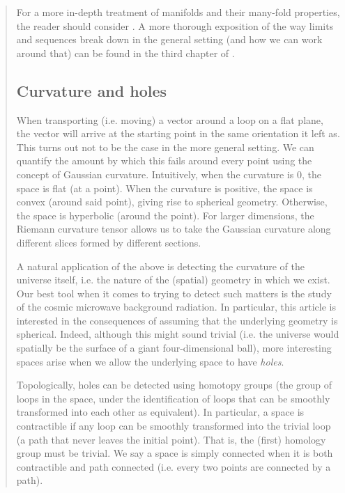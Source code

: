 \documentclass{article}
\theoremstyle{definition}
\begin{document}
\begin{abstract}
For a more in-depth treatment of manifolds and their many-fold properties, the reader should consider \cite{serri}. A more thorough exposition of the way limits and sequences break down in the general setting (and how we can work around that) can be found in the third chapter of \cite{topcat}.

\subsection{Curvature and holes}

When transporting (i.e. moving) a vector around a loop on a flat plane, the vector will arrive at the starting point in the same orientation it left as. This turns out not to be the case in the more general setting. We can quantify the amount by which this fails around every point using the concept of Gaussian curvature. Intuitively, when the curvature is $0$, the space is flat (at a point). When the curvature is positive, the space is convex (around said point), giving rise to spherical geometry. Otherwise, the space is hyperbolic (around the point). For larger dimensions, the Riemann curvature tensor allows us to take the Gaussian curvature along different slices formed by different sections.

A natural application of the above is detecting the curvature of the universe itself, i.e. the nature of the (spatial) geometry in which we exist. Our best tool when it comes to trying to detect such matters is the study of the cosmic microwave background radiation. In particular, this article is interested in the consequences of assuming that the underlying geometry is spherical. Indeed, although this might sound trivial (i.e. the universe would spatially be the surface of a giant four-dimensional ball), more interesting spaces arise when we allow the underlying space to have \emph{holes}.

Topologically, holes can be detected using homotopy groups (the group of loops in the space, under the identification of loops that can be smoothly transformed into each other as equivalent). In particular, a space is contractible if any loop can be smoothly transformed into the trivial loop (a path that never leaves the initial point). That is, the (first) homology group must be trivial. We say a space is simply connected when it is both contractible and path connected (i.e. every two points are connected by a path).



\end{abstract}
\end{document}
